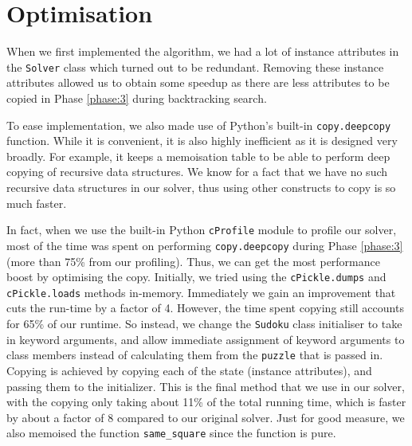 \documentclass[11pt, a4paper]{article}
\begin{document}
\section{Optimisation}
When we first implemented the algorithm, we had a lot of instance attributes in the \texttt{Solver} class which turned out to be redundant.
Removing these instance attributes allowed us to obtain some speedup as there are less attributes to be copied in Phase \ref{phase:3} during backtracking search.

To ease implementation, we also made use of Python's built-in \texttt{copy.deepcopy} function.
While it is convenient, it is also highly inefficient as it is designed very broadly.
For example, it keeps a memoisation table to be able to perform deep copying of recursive data structures.
We know for a fact that we have no such recursive data structures in our solver, thus using other constructs to copy is so much faster.

In fact, when we use the built-in Python \texttt{cProfile} module to profile our solver, most of the time was spent on performing \texttt{copy.deepcopy} during Phase \ref{phase:3} (more than 75\% from our profiling).
Thus, we can get the most performance boost by optimising the copy.
Initially, we tried using the \texttt{cPickle.dumps} and \texttt{cPickle.loads} methods in-memory.
Immediately we gain an improvement that cuts the run-time by a factor of 4.
However, the time spent copying still accounts for 65\% of our runtime.
So instead, we change the \texttt{Sudoku} class initialiser to take in keyword arguments, and allow immediate assignment of keyword arguments to class members instead of calculating them from the \texttt{puzzle} that is passed in.
Copying is achieved by copying each of the state (instance attributes), and passing them to the initializer.
This is the final method that we use in our solver, with the copying only taking about 11\% of the total running time, which is faster by about a factor of 8 compared to our original solver. Just for good measure, we also memoised the function \texttt{same\_square} since the function is pure.
\end{document}
